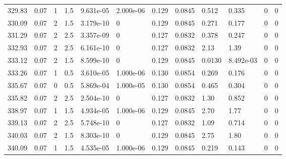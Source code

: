 \documentclass[preview]{standalone}
\begin{document}
{{{{{\begin{tabular}{L{1.2cm}C{1.2cm} C{0.3cm}C{0.5cm} C{1.4cm}C{1.4cm} C{1.4cm}C{1.4cm} C{1.6cm}C{1.6cm} C{1.6cm}C{1.6cm}}
  329.83  &  0.07  & 1     & 1.5 &  9.631e-05  & 2.000e-06  &  0.129&   0.0845& 0.512 & 0.335   &  0 & 0  \\ 
  330.09  &  0.07  & 2     & 1.5 &  3.179e-10  & 0  &  0.129&   0.0845& 0.271 & 0.177   &  0 & 0  \\ 
  331.29  &  0.07  & 2     & 2.5 &  3.357e-09  & 0  &  0.127&   0.0832& 0.378 & 0.247   &  0 & 0  \\ 
  332.93  &  0.07  & 2     & 2.5 &  6.161e-10  & 0  &  0.127&   0.0832& 2.13 & 1.39   &  0 & 0  \\ 
  333.12  &  0.07  & 2     & 1.5 &  8.599e-10  & 0  &  0.129&   0.0845& 0.0130 & 8.492e-03   &  0 & 0  \\ 
  333.26  &  0.07  & 1     & 0.5 &  3.610e-05  & 1.000e-06  &  0.130&   0.0854& 0.269 & 0.176   &  0 & 0  \\ 
  335.67  &  0.07  & 0     & 0.5 &  5.869e-04  & 1.000e-05  &  0.130&   0.0854& 0.465 & 0.304   &  0 & 0  \\ 
  335.82  &  0.07  & 2     & 2.5 &  2.504e-10  & 0  &  0.127&   0.0832& 1.30 & 0.852   &  0 & 0  \\ 
  338.97  &  0.07  & 1     & 1.5 &  4.934e-05  & 1.000e-06  &  0.129&   0.0845& 2.70 & 1.77   &  0 & 0  \\ 
  339.13  &  0.07  & 2     & 2.5 &  5.748e-10  & 0  &  0.127&   0.0832& 1.09 & 0.714   &  0 & 0  \\ 
  340.03  &  0.07  & 2     & 1.5 &  8.303e-10  & 0  &  0.129&   0.0845& 2.75 & 1.80   &  0 & 0  \\ 
  340.09  &  0.07  & 1     & 1.5 &  4.535e-05  & 1.000e-06  &  0.129&   0.0845& 0.219 & 0.143   &  0 & 0  \\ 
\hline 
\end{tabular} 

}}}}}
\end{document}

